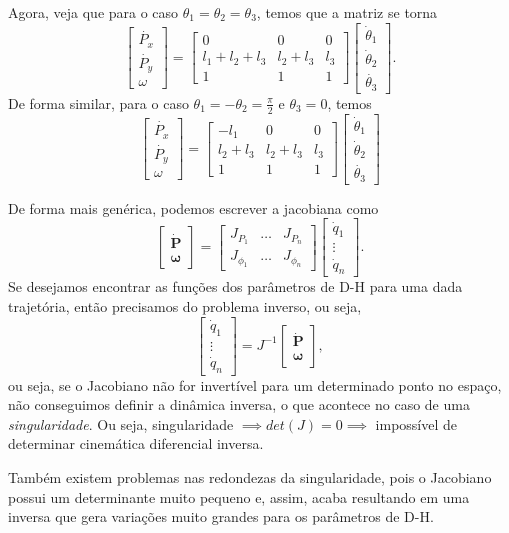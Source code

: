 \begin{eg}
    Agora, veja que para o caso $\theta_1 = \theta_2=\theta_3$, temos que a matriz se torna \[
	\begin{bmatrix} \dot{P_x} \\ \dot{P_y} \\ \omega \end{bmatrix} = \begin{bmatrix} 0 & 0 & 0 \\ l_1+l_2+l_3 & l_2+l_3 & l_3 \\ 1 & 1 & 1 \end{bmatrix} \begin{bmatrix} \dot{\theta}_1 \\ \dot{\theta}_2 \\ \dot{\theta_3} \end{bmatrix} 
    .\] De forma similar, para o caso $\theta_1=-\theta_2=\frac{\pi}{2}$ e $\theta_3=0$, temos \[
	\begin{bmatrix} \dot{P_x} \\ \dot{P_y} \\ \omega \end{bmatrix} = \begin{bmatrix} -l_1 & 0 & 0 \\ l_2+l_3 & l_2+l_3 & l_3 \\ 1 & 1 & 1 \end{bmatrix} \begin{bmatrix} \dot{\theta}_1 \\ \dot{\theta}_2 \\ \dot{\theta_3} \end{bmatrix} 
    \] 
\end{eg}

De forma mais genérica, podemos escrever a jacobiana como \[
    \begin{bmatrix} \bm{\dot{P}} \\ \bm{\omega} \end{bmatrix} = \begin{bmatrix} J_{P_1} & \ldots & J_{P_n} \\ J_{\phi_1} & \ldots & J_{\phi_n} \end{bmatrix} \begin{bmatrix} \dot{q}_1 \\ \vdots \\ \dot{q}_n \end{bmatrix} 
.\] Se desejamos encontrar as funções dos parâmetros de D-H para uma dada trajetória, então precisamos do problema inverso, ou seja, \[
     \begin{bmatrix} \dot{q}_1 \\ \vdots \\ \dot{q}_n \end{bmatrix} = J^{-1}  \begin{bmatrix} \bm{\dot{P}} \\ \bm{\omega} \end{bmatrix}
,\] ou seja, se o Jacobiano não for invertível para um determinado ponto no espaço, não conseguimos definir a dinâmica inversa, o que acontece no caso de uma \emph{singularidade}. Ou seja, singularidade $\implies det\left( J \right) =0 \implies$ impossível de determinar cinemática diferencial inversa.

Também existem problemas nas redondezas da singularidade, pois o Jacobiano possui um determinante muito pequeno e, assim, acaba resultando em uma inversa que gera variações muito grandes para os parâmetros de D-H.


